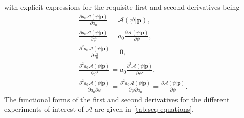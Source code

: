 with explicit expressions for the requisite first and second derivatives being
\begin{subequations}
    \begin{gather}
        \frac{\partial a_0 \mathcal{A} (\psi | \symbf{p})}{\partial a_0} =
            \mathcal{A} (\psi | \symbf{p}),\\
        \frac{\partial a_0 \mathcal{A} (\psi | \symbf{p})}{\partial \psi} =
            a_0 \frac{\partial \mathcal{A} (\psi | \symbf{p})}{\partial \psi},\\
        \frac{\partial^2 a_0 \mathcal{A} (\psi | \symbf{p})}{\partial a_0^2} = 0,\\
        \frac{\partial^2 a_0 \mathcal{A} (\psi | \symbf{p})}{\partial \psi^2} =
            a_0 \frac{\partial^2 \mathcal{A} (\psi | \symbf{p})}{\partial \psi^2},\\
        \frac{\partial^2 a_0 \mathcal{A} (\psi | \symbf{p})}{\partial a_0 \partial \psi} =
            \frac{\partial^2 a_0 \mathcal{A} (\psi | \symbf{p})}{\partial \psi \partial a_0} =
            \frac{\partial \mathcal{A} (\psi | \symbf{p})}{\partial \psi}.
    \end{gather}
\end{subequations}
The functional forms of the first and second derivatives for the different
experiments of interest of $\mathcal{A}$ are given in
\cref{tab:seq-equations}.

